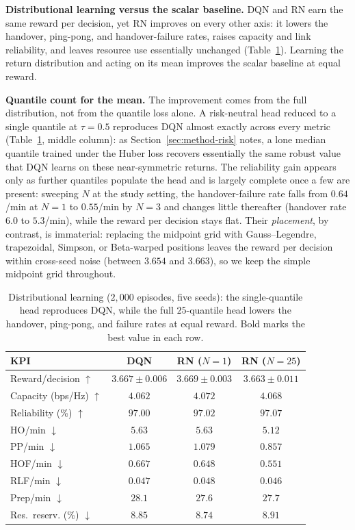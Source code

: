 \documentclass[conference]{IEEEtran}
\begin{document}
\textbf{Distributional learning versus the scalar baseline.}
DQN and RN earn the same reward per decision, yet RN improves on
every other axis: it lowers the handover, ping-pong, and handover-failure rates,
raises capacity and link reliability, and leaves resource use essentially
unchanged (Table~\ref{tab:dist}). Learning the return distribution and acting on
its mean improves the scalar baseline at equal reward.

\textbf{Quantile count for the mean.}
The improvement comes from the full
distribution, not from the quantile loss alone. A risk-neutral head reduced to a
single quantile at $\tau=0.5$ reproduces DQN almost exactly across every metric
(Table~\ref{tab:dist}, middle column): as Section~\ref{sec:method-risk} notes, a
lone median quantile trained under the Huber loss recovers essentially the same
robust value that DQN learns on these near-symmetric returns. The reliability gain
appears only as further quantiles populate the head and is largely complete once a
few are present: sweeping $N$ at the study setting, the handover-failure rate falls
from $0.64$/min at $N{=}1$ to $0.55$/min by $N{=}3$ and changes little thereafter
(handover rate $6.0$ to $5.3$/min), while the reward per decision stays flat. Their
\emph{placement}, by contrast, is immaterial:
replacing the midpoint grid with Gauss--Legendre, trapezoidal, Simpson, or
Beta-warped positions leaves the reward per decision within cross-seed noise
(between $3.654$ and $3.663$), so we keep the simple midpoint grid throughout.

\begin{table}[htbp]
\caption{Distributional learning ($2{,}000$ episodes, five seeds): the
single-quantile head reproduces DQN, while the full $25$-quantile head lowers the
handover, ping-pong, and failure rates at equal reward. Bold marks the best value
in each row.}
\label{tab:dist}
\centering
\begin{tabular}{|l|c|c|c|}
\hline
\textbf{KPI} & \textbf{DQN} & \textbf{RN ($N{=}1$)} & \textbf{RN ($N{=}25$)} \\
\hline
Reward/decision $\uparrow$          & $3.667{\pm}0.006$ & $\mathbf{3.669{\pm}0.003}$ & $3.663{\pm}0.011$ \\
Capacity (bps/Hz) $\uparrow$        & $4.062$ & $\mathbf{4.072}$ & $4.068$ \\
Reliability (\%) $\uparrow$         & $97.00$ & $97.02$ & $\mathbf{97.07}$ \\
HO/min $\downarrow$                 & $5.63$  & $5.63$  & $\mathbf{5.12}$  \\
PP/min $\downarrow$                 & $1.065$ & $1.079$ & $\mathbf{0.857}$ \\
HOF/min $\downarrow$                & $0.667$ & $0.648$ & $\mathbf{0.551}$ \\
RLF/min $\downarrow$                & $0.047$ & $0.048$ & $\mathbf{0.046}$ \\
Prep/min $\downarrow$               & $28.1$  & $\mathbf{27.6}$  & $27.7$  \\
Res.\ reserv. (\%) $\downarrow$ & $8.85$  & $\mathbf{8.74}$  & $8.91$  \\
\hline
\end{tabular}
\end{table}
\end{document}
